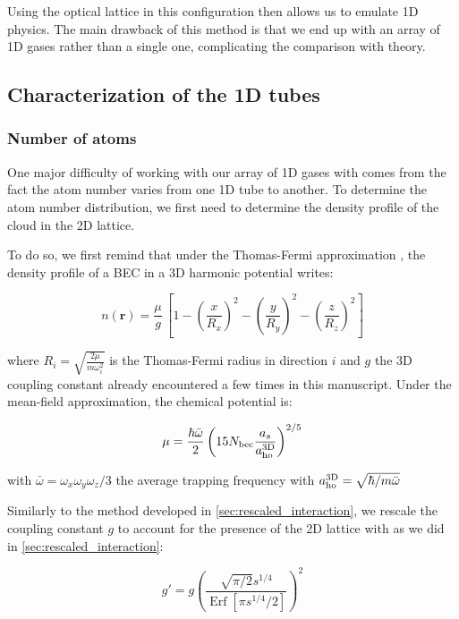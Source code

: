 Using the optical lattice in this configuration then allows us to emulate 1D physics. The main drawback of this method is that we end up with an array of 1D gases rather than a single one, complicating the comparison with theory.


\subsection{Characterization of the 1D tubes}

\subsubsection{Number of atoms}

One major difficulty of working with our array of 1D gases with comes from the fact the atom number varies from one 1D tube to another. To determine the atom number distribution, we first need to determine the density profile of the cloud in the 2D lattice.

To do so, we first remind that under the Thomas-Fermi approximation \cite{pethick2008bose}, the density profile of a BEC in a 3D harmonic potential writes:

\begin{equation}
     n(\bm{r}) = \frac{\mu}{g} \, \left[ 1 - \left( \frac{x}{R_x} \right)^2 - \left( \frac{y}{R_y} \right)^2 - \left( \frac{z}{R_z} \right)^2 \right]
\end{equation}

\noindent where $R_i = \sqrt{\frac{2 \mu}{m \omega_i^2}}$ is the Thomas-Fermi radius in direction $i$ and $g$ the 3D coupling constant already encountered a few times in this manuscript. Under the mean-field approximation, the chemical potential is:

\begin{equation}
     \mu = \frac{\hbar \bar{\omega}}{2} \left(  15 N_{\rm{bec}} \frac{a_s}{a^{\rm{3D}}_{\rm{ho}}}\right)^{2/5}
\end{equation}

\noindent with $\bar{\omega}=\omega_x \omega_y \omega_z/3$ the average trapping frequency with $a^{\rm{3D}}_{\rm{ho}}=\sqrt{\hbar/m \bar{\omega}}$

Similarly to the method developed in \ref{sec:rescaled_interaction}, we rescale the coupling constant $g$ \cite{kramer2002macroscopic} to account for the presence of the 2D lattice with as we did in \ref{sec:rescaled_interaction}:

\begin{equation}
    g'=g\left(\frac{\sqrt{\pi / 2} s^{1 / 4}}{\operatorname{Erf}\left[\pi s^{1 / 4} / 2\right]}\right)^{2}
\end{equation} 

